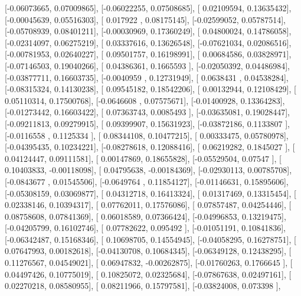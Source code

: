 \documentclass{article}
\begin{document}
       [-0.06073665,  0.07009865],
       [-0.06022255,  0.07508685],
       [ 0.02109594,  0.13635432],
       [-0.00045639,  0.05516303],
       [ 0.017922  ,  0.08175145],
       [-0.02599052,  0.05787514],
       [-0.05708939,  0.08401211],
       [-0.00030969,  0.17360249],
       [ 0.04800024,  0.14786058],
       [-0.02314097,  0.06275219],
       [ 0.03337616,  0.13626548],
       [-0.07621034,  0.02086516],
       [-0.00781953,  0.02640227],
       [ 0.09501757,  0.16198991],
       [ 0.00684586,  0.03828971],
       [-0.07146503,  0.19040266],
       [ 0.04386361,  0.1665593 ],
       [-0.02050392,  0.04486984],
       [-0.03877711,  0.16603735],
       [-0.0040959 ,  0.12731949],
       [ 0.0638431 ,  0.04538284],
       [-0.08315324,  0.14130238],
       [ 0.09545182,  0.18542206],
       [ 0.00132944,  0.12108429],
       [ 0.05110314,  0.17500768],
       [-0.0646608 ,  0.07575671],
       [-0.01400928,  0.13364283],
       [-0.01273442,  0.16603422],
       [ 0.07363743,  0.0085493 ],
       [-0.03635081,  0.19028447],
       [-0.09211813,  0.09279915],
       [ 0.09399907,  0.15631923],
       [-0.03872186,  0.1133807 ],
       [-0.0116558 ,  0.1125334 ],
       [ 0.08344108,  0.10477215],
       [ 0.00333475,  0.05780978],
       [-0.04395435,  0.10234221],
       [-0.08278618,  0.12088416],
       [ 0.06219282,  0.1845027 ],
       [ 0.04124447,  0.09111581],
       [ 0.00147869,  0.18655828],
       [-0.05529504,  0.07547   ],
       [ 0.10403833, -0.00118098],
       [ 0.04795638, -0.00184369],
       [-0.02930113,  0.00785708],
       [-0.0843677 ,  0.01545506],
       [-0.0649764 ,  0.11854127],
       [-0.01146631,  0.15895606],
       [-0.05308159,  0.03069877],
       [ 0.04312718,  0.16413324],
       [ 0.01317469,  0.13315454],
       [ 0.02338146,  0.10394317],
       [ 0.07762011,  0.17576086],
       [ 0.07857487,  0.04254446],
       [ 0.08758608,  0.07841369],
       [ 0.06018589,  0.07366424],
       [-0.04996853,  0.13219475],
       [-0.04205799,  0.16102746],
       [ 0.07782622,  0.095492  ],
       [-0.01051191,  0.10841836],
       [-0.06342487,  0.15168346],
       [ 0.10698705,  0.14554945],
       [-0.04058295,  0.16278751],
       [ 0.07647993,  0.00182618],
       [-0.04130708,  0.10684345],
       [-0.06349128,  0.12438295],
       [ 0.11276567,  0.04549021],
       [ 0.06947832, -0.00262875],
       [-0.01760263,  0.1766645 ],
       [ 0.04497426,  0.10775019],
       [ 0.10825072,  0.02325684],
       [-0.07867638,  0.02497161],
       [ 0.02270218,  0.08580955],
       [ 0.08211966,  0.15797581],
       [-0.03824008,  0.073398  ],
\end{document}
